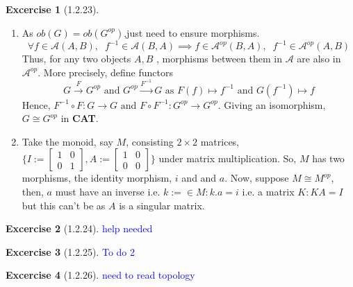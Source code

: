 \documentclass{article}
\theoremstyle{definition}
\newtheorem*{excercise}{Excercise}
\begin{document}
\begin{excercise}[1.2.23] %
	\begin{enumerate}[label=(\alph*)]
		\item As $ob(G)=ob(G^{op})$,just need to ensure morphisms.
			\[\forall f \in \mathcal{A}(A,B) ,\; \; f^{-1} \in \mathcal{A}(B,A) \implies
			f \in \mathcal{A}^{op}(B,A) ,\; \; f^{-1} \in \mathcal{A}^{op}(A,B) \]
			Thus, for any two objects $A,B$ , morphisms between them in $\mathcal{A} $
			are also in $\mathcal{A} ^{op}$. More precisely, define functors
			\[ G \xrightarrow{F} G^{op} \text{ and } G^{op} \xrightarrow{F^{-1}} G \text{ as }
			F(f)\mapsto f^{-1} \text{ and } G(f^{-1}) \mapsto f \]
			Hence, $ F^{-1} \circ F : G \rightarrow G \text{ and } F \circ  F^{-1} : G^{op} \rightarrow G^{op}$.
			Giving an isomorphism, $G\cong G^{op}$  in \textbf{CAT}.
		\item Take the monoid, say $M$, consisting $2\times2$ matrices, $\Bigg\{
				I:=\begin{bmatrix}
					1 & 0 \\
					0 & 1
				\end{bmatrix},
				A:=\begin{bmatrix}
					1 & 0 \\
					0 & 0
			\end{bmatrix}\Bigg\}$ under matrix multiplication.
			So, $M$ has two morphisms, the identity morphism, $i$ and and $a$.
			Now, suppose $M \cong M^{op} $, then, $a$ must have an inverse i.e.
			$ k:= \in M : k.a=i $ i.e. a matrix $K: KA = I$ but this can't be as $A$ is a singular matrix.
	\end{enumerate}
\end{excercise}
\begin{excercise}[1.2.24] %
	\textcolor{blue}{help needed}
\end{excercise}
\begin{excercise}[1.2.25] %
		\item \textcolor{blue}{To do 2}
\end{excercise}
\begin{excercise}[1.2.26] %
	\textcolor{blue}{need to read topology}
\end{excercise}
\end{document}
